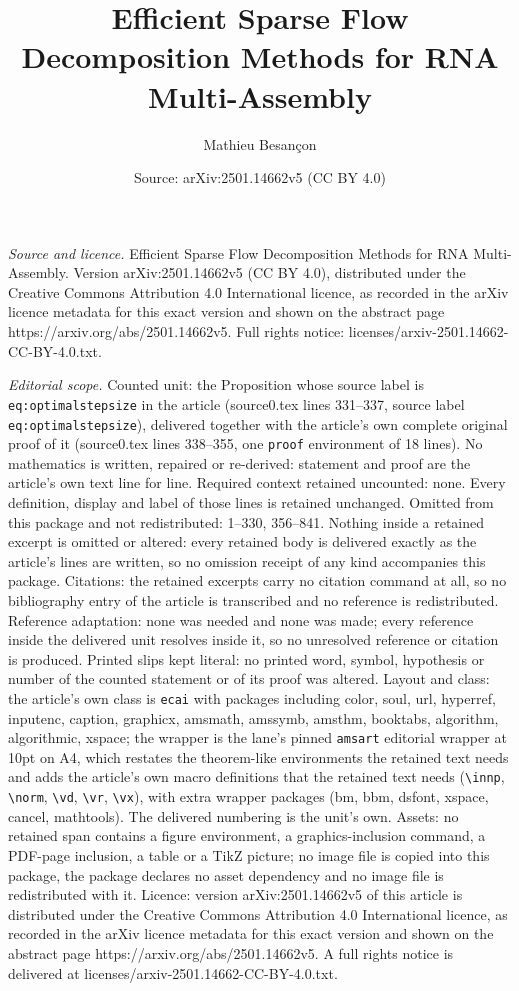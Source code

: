 \documentclass[10pt,a4paper]{amsart}
\title[Efficient Sparse Flow Decomposition Methods for RNA Multi-As]{Efficient Sparse Flow Decomposition Methods for RNA Multi-Assembly}
\author{Mathieu Besan\c{c}on}
\date{Source: arXiv:2501.14662v5 (CC BY 4.0)}
\begin{document}
\maketitle

\noindent\emph{Source and licence.} Efficient Sparse Flow Decomposition Methods for RNA Multi-Assembly. Version arXiv:2501.14662v5 (CC BY 4.0), distributed under the Creative Commons Attribution 4.0 International licence, as recorded in the arXiv licence metadata for this exact version and shown on the abstract page https://arxiv.org/abs/2501.14662v5. Full rights notice: licenses/arxiv-2501.14662-CC-BY-4.0.txt.\par\smallskip

\noindent\textit{Editorial scope.} Counted unit: the Proposition whose source label is \texttt{eq:optimalstepsize} in the article (source0.tex lines 331--337, source label \texttt{eq:optimalstepsize}), delivered together with the article's own complete original proof of it (source0.tex lines 338--355, one \texttt{proof} environment of 18 lines). No mathematics is written, repaired or re-derived: statement and proof are the article's own text line for line. Required context retained uncounted: none. Every definition, display and label of those lines is retained unchanged. Omitted from this package and not redistributed: 1--330, 356--841. Nothing inside a retained excerpt is omitted or altered: every retained body is delivered exactly as the article's lines are written, so no omission receipt of any kind accompanies this package. Citations: the retained excerpts carry no citation command at all, so no bibliography entry of the article is transcribed and no reference is redistributed. Reference adaptation: none was needed and none was made; every reference inside the delivered unit resolves inside it, so no unresolved reference or citation is produced. Printed slips kept literal: no printed word, symbol, hypothesis or number of the counted statement or of its proof was altered. Layout and class: the article's own class is \texttt{ecai} with packages including color, soul, url, hyperref, inputenc, caption, graphicx, amsmath, amssymb, amsthm, booktabs, algorithm, algorithmic, xspace; the wrapper is the lane's pinned \texttt{amsart} editorial wrapper at 10pt on A4, which restates the theorem-like environments the retained text needs and adds the article's own macro definitions that the retained text needs (\texttt{\textbackslash innp}, \texttt{\textbackslash norm}, \texttt{\textbackslash vd}, \texttt{\textbackslash vr}, \texttt{\textbackslash vx}), with extra wrapper packages (bm, bbm, dsfont, xspace, cancel, mathtools). The delivered numbering is the unit's own. Assets: no retained span contains a figure environment, a graphics-inclusion command, a PDF-page inclusion, a table or a TikZ picture; no image file is copied into this package, the package declares no asset dependency and no image file is redistributed with it. Licence: version arXiv:2501.14662v5 of this article is distributed under the Creative Commons Attribution 4.0 International licence, as recorded in the arXiv licence metadata for this exact version and shown on the abstract page https://arxiv.org/abs/2501.14662v5. A full rights notice is delivered at licenses/arxiv-2501.14662-CC-BY-4.0.txt. 
\end{document}
